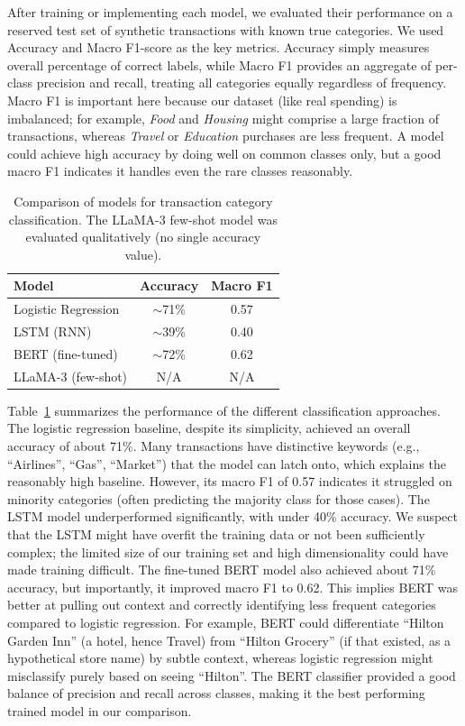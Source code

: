 \documentclass{scrartcl}
\begin{document}
After training or implementing each model, we evaluated their performance on a reserved test set of synthetic transactions with known true categories. We used Accuracy and Macro F1-score as the key metrics. Accuracy simply measures overall percentage of correct labels, while Macro F1 provides an aggregate of per-class precision and recall, treating all categories equally regardless of frequency. Macro F1 is important here because our dataset (like real spending) is imbalanced; for example, \textit{Food} and \textit{Housing} might comprise a large fraction of transactions, whereas \textit{Travel} or \textit{Education} purchases are less frequent. A model could achieve high accuracy by doing well on common classes only, but a good macro F1 indicates it handles even the rare classes reasonably.

\begin{table}[ht]
    \centering
    \begin{tabular}{lcc}
        \toprule
        \textbf{Model} & \textbf{Accuracy} & \textbf{Macro F1} \\
        \midrule
        Logistic Regression & $\sim$71\% & 0.57 \\
        LSTM (RNN) & $\sim$39\% & 0.40 \\
        BERT (fine-tuned) & $\sim$72\% & 0.62 \\
        LLaMA-3 (few-shot) & N/A & N/A \\
        \bottomrule
    \end{tabular}
    \caption{Comparison of models for transaction category classification. The LLaMA-3 few-shot model was evaluated qualitatively (no single accuracy value).}
    \label{tab:class_perf}
\end{table}

Table~\ref{tab:class_perf} summarizes the performance of the different classification approaches. The logistic regression baseline, despite its simplicity, achieved an overall accuracy of about 71\%. Many transactions have distinctive keywords (e.g., “Airlines”, “Gas”, “Market”) that the model can latch onto, which explains the reasonably high baseline. However, its macro F1 of 0.57 indicates it struggled on minority categories (often predicting the majority class for those cases). The LSTM model underperformed significantly, with under 40\% accuracy. We suspect that the LSTM might have overfit the training data or not been sufficiently complex; the limited size of our training set and high dimensionality could have made training difficult. The fine-tuned BERT model also achieved about 71\% accuracy, but importantly, it improved macro F1 to 0.62. This implies BERT was better at pulling out context and correctly identifying less frequent categories compared to logistic regression. For example, BERT could differentiate “Hilton Garden Inn” (a hotel, hence Travel) from “Hilton Grocery” (if that existed, as a hypothetical store name) by subtle context, whereas logistic regression might misclassify purely based on seeing “Hilton”. The BERT classifier provided a good balance of precision and recall across classes, making it the best performing trained model in our comparison.
\end{document}
